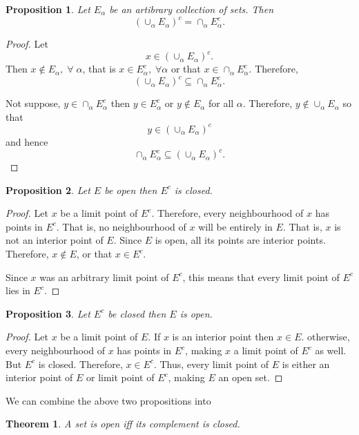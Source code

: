 \documentclass{article}
\theoremstyle{plain}
\newtheorem{thm}{Theorem}
\numberwithin{thm}{section}
\theoremstyle{plain}
\newtheorem{prop}{Proposition}
\numberwithin{prop}{section}
\theoremstyle{definition}
\numberwithin{defn}{section}
\theoremstyle{remark}
\numberwithin{equation}{section}
\begin{document}
\begin{prop}\label{s1p8}
Let $E_\alpha$ be an artibrary collection of sets. Then
\[
\left(\cup_\alpha E_\alpha\right)^c = \cap_\alpha E_\alpha^c.
\]
\end{prop}
\begin{proof}
Let
\[
x \in \left(\cup_\alpha E_\alpha\right)^c.
\]
Then $x \notin E_\alpha, \;\forall\; \alpha$, that is $x \in E_\alpha^c, 
\;\forall\alpha$ or that $x \in \cap_\alpha E_\alpha^c$. Therefore,
\[
\left(\cup_\alpha E_\alpha\right)^c \subseteq \cap_\alpha E_\alpha^c.
\]

Not suppose, $y \in \cap_\alpha E_\alpha^c$ then $y \in E_\alpha^c$ or $y
\notin E_\alpha$ for all $\alpha$. Therefore, $y \notin \cup_\alpha E_\alpha$
so that 
\[
y \in \left(\cup_\alpha E_\alpha\right)^c
\]
and hence
\[
\cap_\alpha E_\alpha^c \subseteq \left(\cup_\alpha E_\alpha\right)^c.
\]
\end{proof}

\begin{prop}\label{s1e9}
Let $E$ be open then $E^c$ is closed.
\end{prop}
\begin{proof}
Let $x$ be a limit point of $E^c$. Therefore, every neighbourhood of $x$ has
points in $E^c$. That is, no neighbourhood of $x$ will be entirely in $E$.
That is, $x$ is not an interior point of $E$. Since $E$ is open, all its points
are interior points. Therefore, $x \notin E$, or that $x \in E^c$.

Since $x$ was an arbitrary limit point of $E^c$, this means that every limit
point of $E^c$ lies in $E^c$.
\end{proof}

\begin{prop}\label{s1e10}
Let $E^c$ be closed then $E$ is open.
\end{prop}
\begin{proof}
Let $x$ be a limit point of $E$. If $x$ is an interior point then $x \in E$.
otherwise, every neighbourhood of $x$ has points in $E^c$, making $x$ a limit 
point of $E^c$ as well. But $E^c$ is closed. Therefore, $x \in E^c$. Thus, 
every limit point of $E$ is either an interior point of $E$ or limit point of
$E^c$, making $E$ an open set.
\end{proof}

We can combine the above two propositions into
\begin{thm}\label{s1t1}
A set is open iff its complement is closed.
\end{thm}
\end{document}
